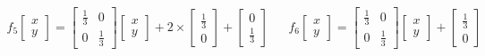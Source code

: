 \documentclass[a4paper,10pt]{report}
\begin{document}
\begin{equation}
\begin{array}{lll}
f_5 \left[ \begin{array}{l} x \\ y \end{array} \right] =
\left[ \begin{array}{ll} \frac{1}{3} & 0 \\ 0 & \frac{1}{3} \end{array} \right]
\left[ \begin{array}{l} x \\ y \end{array} \right]
+ 2 \times \left[ \begin{array}{l} \frac{1}{3} \\ 0 \end{array} \right] + \left[ \begin{array}{l} 0 \\ \frac{1}{3} \end{array} \right]
& &
f_6 \left[ \begin{array}{l} x \\ y \end{array} \right] =
\left[ \begin{array}{ll} \frac{1}{3} & 0 \\ 0 & \frac{1}{3} \end{array} \right]
\left[ \begin{array}{l} x \\ y \end{array} \right]
+ \left[ \begin{array}{l} \frac{1}{3} \\ 0 \end{array} \right]\\ \\


\end{array}
\end{equation}
\end{document}
